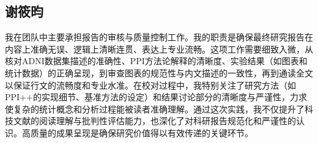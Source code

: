 \documentclass[12pt,a4paper]{article}
\begin{document}
\subsection{谢筱昀}

我在团队中主要承担报告的审核与质量控制工作。我的职责是确保最终研究报告在内容上准确无误、逻辑上清晰连贯、表达上专业流畅。这项工作需要细致入微，从核对ADNI数据集描述的准确性、PPI方法论解释的清晰度、实验结果（如图表和统计数据）的正确呈现，到审查图表的规范性与内文描述的一致性，再到通读全文以保证行文的流畅度和专业水准。在校对过程中，我特别关注了研究方法（如PPI++的实现细节、基准方法的设定）和结果讨论部分的清晰度与严谨性，力求使复杂的统计概念和分析过程能被读者准确理解。通过这次实践，我不仅提升了科技文献的阅读理解与批判性评估能力，也深化了对科研报告规范化和严谨性的认识。高质量的成果呈现是确保研究价值得以有效传递的关键环节。
\end{document}

